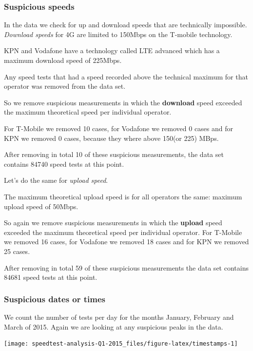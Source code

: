 \documentclass[]{article}
\begin{document}
\subsubsection{Suspicious speeds}\label{suspicious-speeds}

In the data we check for up and download speeds that are technically
impossible. \emph{Download speeds} for 4G are limited to 150Mbps on the
T-mobile technology.

KPN and Vodafone have a technology called LTE advanced which has a
maximum download speed of 225Mbps.

Any speed tests that had a speed recorded above the technical maximum
for that operator was removed from the data set.

So we remove suspicious measurements in which the \textbf{download}
speed exceeded the maximum theoretical speed per individual operator.

For T-Mobile we removed 10 cases, for Vodafone we removed 0 cases and
for KPN we removed 0 cases, because they where above 150(or 225) MBps.

After removing in total 10 of these suspicious measurements, the data
set contains 84740 speed tests at this point.

Let's do the same for \emph{upload speed}.

The maximum theoretical upload speed is for all operators the same:
maximum upload speed of 50Mbps.

So again we remove suspicious measurements in which the \textbf{upload}
speed exceeded the maximum theoretical speed per individual operator.
For T-Mobile we removed 16 cases, for Vodafone we removed 18 cases and
for KPN we removed 25 cases.

After removing in total 59 of these suspicious measurements the data set
contains 84681 speed tests at this point.
\newpage

\subsubsection{Suspicious dates or
times}\label{suspicious-dates-or-times}

We count the number of tests per day for the months January, February
and March of 2015. Again we are looking at any suspicious peaks in the
data.

\begin{center}\texttt{[image: speedtest-analysis-Q1-2015\_files/figure-latex/timestamps-1]} \end{center}
\end{document}
